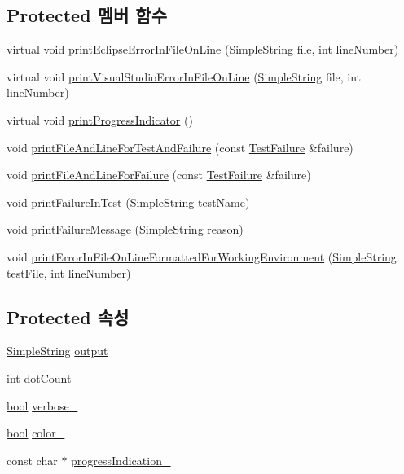\subsection*{Protected 멤버 함수}
\begin{DoxyCompactItemize}
\item 
virtual void \hyperlink{class_test_output_aa2b6f28b76a53cac4059991bc3c86f79}{print\+Eclipse\+Error\+In\+File\+On\+Line} (\hyperlink{class_simple_string}{Simple\+String} file, int line\+Number)
\item 
virtual void \hyperlink{class_test_output_a0a0136e850e6b9a696ab84e5c416341a}{print\+Visual\+Studio\+Error\+In\+File\+On\+Line} (\hyperlink{class_simple_string}{Simple\+String} file, int line\+Number)
\item 
virtual void \hyperlink{class_test_output_a0cd44d3b6da1caa7b8d335ef7580a391}{print\+Progress\+Indicator} ()
\item 
void \hyperlink{class_test_output_ae20c439e68036cc705a86d9a95954168}{print\+File\+And\+Line\+For\+Test\+And\+Failure} (const \hyperlink{class_test_failure}{Test\+Failure} \&failure)
\item 
void \hyperlink{class_test_output_a1d78706f5181a464f5fafb178d231be9}{print\+File\+And\+Line\+For\+Failure} (const \hyperlink{class_test_failure}{Test\+Failure} \&failure)
\item 
void \hyperlink{class_test_output_a1748d410d65b95596df95234742258a3}{print\+Failure\+In\+Test} (\hyperlink{class_simple_string}{Simple\+String} test\+Name)
\item 
void \hyperlink{class_test_output_ab13cdfa930cc1ad29b36b1ab7ff77a99}{print\+Failure\+Message} (\hyperlink{class_simple_string}{Simple\+String} reason)
\item 
void \hyperlink{class_test_output_a56ae5964123fc91c7149a8274aa22db9}{print\+Error\+In\+File\+On\+Line\+Formatted\+For\+Working\+Environment} (\hyperlink{class_simple_string}{Simple\+String} test\+File, int line\+Number)
\end{DoxyCompactItemize}
\subsection*{Protected 속성}
\begin{DoxyCompactItemize}
\item 
\hyperlink{class_simple_string}{Simple\+String} \hyperlink{class_string_buffer_test_output_a3da6195a18b2c45dff4c9b8a4e31e5c8}{output}
\item 
int \hyperlink{class_test_output_a3c1c7e8cf0310d384198f0dc504251c6}{dot\+Count\+\_\+}
\item 
\hyperlink{avb__gptp_8h_af6a258d8f3ee5206d682d799316314b1}{bool} \hyperlink{class_test_output_a86126da532c138842a42d8e9a52b0806}{verbose\+\_\+}
\item 
\hyperlink{avb__gptp_8h_af6a258d8f3ee5206d682d799316314b1}{bool} \hyperlink{class_test_output_adda8c1875964c3b80ed1c77b585fc756}{color\+\_\+}
\item 
const char $\ast$ \hyperlink{class_test_output_a4cbc8ea3886624399ab3879767d4f018}{progress\+Indication\+\_\+}
\end{DoxyCompactItemize}
